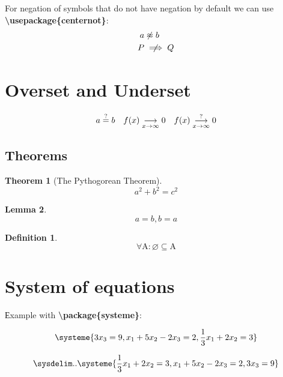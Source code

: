 \documentclass[12pt]{article}
\newtheorem{thm}{Theorem}
\newtheorem{lem}[thm]{Lemma} %
\newtheorem{defn}{Definition}
\begin{document}
\noindent For negation of symbols that do not have negation by default we can use \textbf{\textbackslash usepackage\{centernot\}}:
\begin{align*}
    a &\centernot \approx b \\
    P &\centernot \implies Q \\
\end{align*}

\section{Overset and Underset}

\begin{equation*}
    \begin{array}{c c c}
        a \overset{?}{=} b &
        f(x) \underset{x \to \infty}{\longrightarrow} 0 &
        f(x) \overset{?}{\underset{x \to \infty}{\longrightarrow}} 0
    \end{array}
\end{equation*}

\subsection{Theorems}

\begin{thm}[The Pythogorean Theorem] \label{eq:PythogoreanTheorem}
    $$ a^2 + b^2 = c^2 $$
\end{thm}

\begin{lem}
    $$  a = b, b = a $$
\end{lem}

\begin{defn}
    $$ \forall \mathrm{A}: \varnothing \subseteq \mathrm{A} $$
\end{defn}

\section{System of equations}

\noindent Еxample with \textbf{\textbackslash package\{systeme\}}:

\begin{equation*}
    \systeme{
        3x_{3} = 9,
        x_{1} + 5x_{2} - 2x_{3} = 2,
        \frac{1}{3}x_{1} + 2x_{2} = 3
    }
\end{equation*}

\begin{equation*}
    \sysdelim..\systeme{
        \frac{1}{3}x_{1} + 2x_{2} = 3,
        x_{1} + 5x_{2} - 2x_{3} = 2,
        3x_{3} = 9
    }
\end{equation*}
\end{document}
